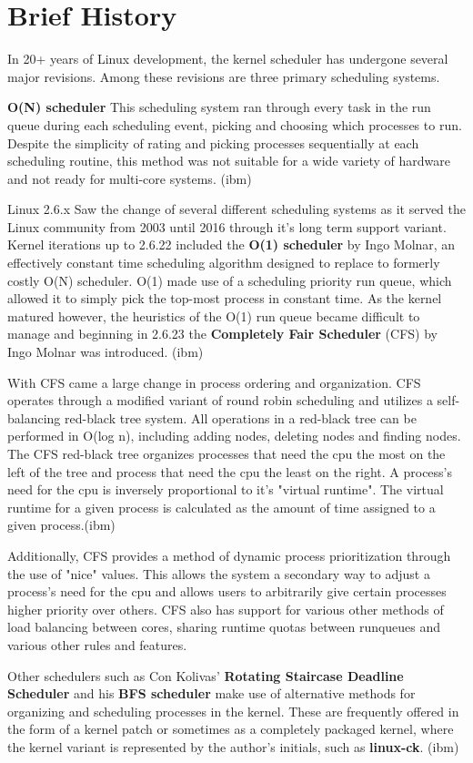 \section{Brief History}

In 20+ years of Linux development, the kernel scheduler has undergone several major revisions. Among these revisions are three primary scheduling systems.

\textbf{O(N) scheduler} This scheduling system ran through every task in the run queue during each scheduling event, picking and choosing which processes to run. Despite the simplicity of rating and picking processes sequentially at each scheduling routine, this method was not suitable for a wide variety of hardware and not ready for multi-core systems. (ibm)

Linux 2.6.x Saw the change of several different scheduling systems as it served the Linux community from 2003 until 2016 through it's long term support variant. Kernel iterations up to 2.6.22 included the \textbf{O(1) scheduler} by Ingo Molnar, an effectively constant time scheduling algorithm designed to replace to formerly costly O(N) scheduler. O(1) made use of a scheduling priority run queue, which allowed it to simply pick the top-most process in constant time. As the kernel matured however, the heuristics of the O(1) run queue became difficult to manage and beginning in 2.6.23 the \textbf{Completely Fair Scheduler} (CFS) by Ingo Molnar was introduced. (ibm)

With CFS came a large change in process ordering and organization. CFS operates through a modified variant of round robin scheduling and utilizes a self-balancing red-black tree system. All operations in a red-black tree can be performed in O(log n), including adding nodes, deleting nodes and finding nodes. The CFS red-black tree organizes processes that need the cpu the most on the left of the tree and process that need the cpu the least on the right. A process's need for the cpu is inversely proportional to it's "virtual runtime". The virtual runtime for a given process is calculated as the amount of time assigned to a given process.(ibm)

Additionally, CFS provides a method of dynamic process prioritization through the use of "nice" values. This allows the system a secondary way to adjust a process's need for the cpu and allows users to arbitrarily give certain processes higher priority over others. CFS also has support for various other methods of load balancing between cores, sharing runtime quotas between runqueues and various other rules and features.

Other schedulers such as Con Kolivas' \textbf{Rotating Staircase Deadline Scheduler} and his \textbf{BFS scheduler} make use of alternative methods for organizing and scheduling processes in the kernel. These are frequently offered in the form of a kernel patch or sometimes as a completely packaged kernel, where the kernel variant is represented by the author's initials, such as \textbf{linux-ck}. (ibm)